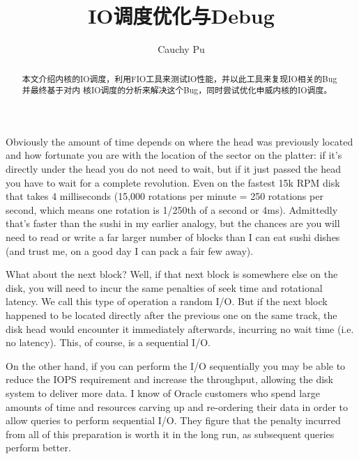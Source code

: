\documentclass[scheme=plain]{ctexart}
\title{IO调度优化与Debug}
\author{Cauchy Pu}
\begin{document}
\maketitle

\begin{abstract}
本文介绍内核的IO调度，利用FIO工具来测试IO性能，并以此工具来复现IO相关的Bug并最终基于对内
核IO调度的分析来解决这个Bug，同时尝试优化申威内核的IO调度。
\end{abstract}

\clearpage
{}
\tableofcontents

\clearpage
{}
Obviously the amount of time depends on where the head was previously located and how
fortunate you are with the location of the sector on the platter: if it’s
directly under the head you do not need to wait, but if it just passed the head you have
to wait for a complete revolution. Even on the fastest 15k RPM disk that
takes 4 milliseconds (15,000 rotations per minute = 250 rotations per second, which means
one rotation is 1/250th of a second or 4ms). Admittedly that’s faster than
the sushi in my earlier analogy, but the chances are you will need to read or write a far
larger number of blocks than I can eat sushi dishes (and trust me, on a
good day I can pack a fair few away).

What about the next block? Well, if that next block is somewhere else on the disk, you
will need to incur the same penalties of seek time and rotational latency. We
call this type of operation a random I/O. But if the next block happened to be located
directly after the previous one on the same track, the disk head would
encounter it immediately afterwards, incurring no wait time (i.e. no latency). This, of
course, is a sequential I/O.

On the other hand, if you can perform the I/O sequentially you may be able to reduce the
IOPS requirement and increase the throughput, allowing the disk system to
deliver more data. I know of Oracle customers who spend large amounts of time and
resources carving up and re-ordering their data in order to allow queries to
perform sequential I/O. They figure that the penalty incurred from all of this preparation
is worth it in the long run, as subsequent queries perform better.
\end{document}
